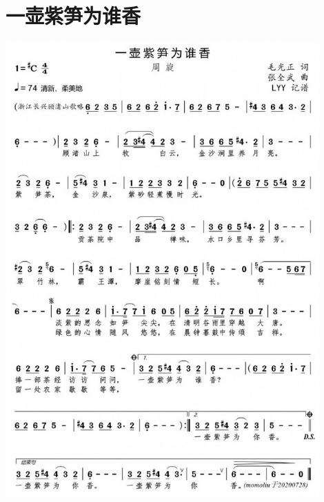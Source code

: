 \documentclass[cn,pad,twocol]{elegantbook}
\begin{document}
\section{一壶紫笋为谁香}\includegraphics[width=0.9\textwidth]{dongxiao/20200901-一壶紫笋为谁香.jpeg} 
\end{document}
